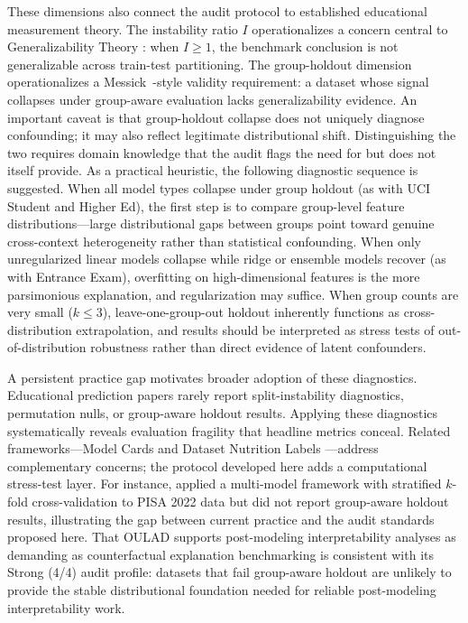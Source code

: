 \documentclass[10pt,letterpaper]{wlscirep}
\begin{document}
These dimensions also connect the audit protocol to established educational measurement theory. The instability ratio $I$ operationalizes a concern central to Generalizability Theory \citep{Brennan2001}: when $I \geq 1$, the benchmark conclusion is not generalizable across train-test partitioning. The group-holdout dimension operationalizes a Messick~\citep{Messick1995}-style validity requirement: a dataset whose signal collapses under group-aware evaluation lacks generalizability evidence. An important caveat is that group-holdout collapse does not uniquely diagnose confounding; it may also reflect legitimate distributional shift. Distinguishing the two requires domain knowledge that the audit flags the need for but does not itself provide. As a practical heuristic, the following diagnostic sequence is suggested. When all model types collapse under group holdout (as with UCI Student and Higher Ed), the first step is to compare group-level feature distributions---large distributional gaps between groups point toward genuine cross-context heterogeneity rather than statistical confounding. When only unregularized linear models collapse while ridge or ensemble models recover (as with Entrance Exam), overfitting on high-dimensional features is the more parsimonious explanation, and regularization may suffice. When group counts are very small ($k \leq 3$), leave-one-group-out holdout inherently functions as cross-distribution extrapolation, and results should be interpreted as stress tests of out-of-distribution robustness rather than direct evidence of latent confounders.

A persistent practice gap motivates broader adoption of these diagnostics. Educational prediction papers rarely report split-instability diagnostics, permutation nulls, or group-aware holdout results. Applying these diagnostics systematically reveals evaluation fragility that headline metrics conceal. Related frameworks---Model Cards \citep{Mitchell2019} and Dataset Nutrition Labels \citep{Holland2020}---address complementary concerns; the protocol developed here adds a computational stress-test layer. For instance, \citet{Sasmaz2026} applied a multi-model framework with stratified $k$-fold cross-validation to PISA 2022 data but did not report group-aware holdout results, illustrating the gap between current practice and the audit standards proposed here. That OULAD supports post-modeling interpretability analyses as demanding as counterfactual explanation benchmarking \citep{Cavus2024ce,Cavus2024benchmark} is consistent with its Strong (4/4) audit profile: datasets that fail group-aware holdout are unlikely to provide the stable distributional foundation needed for reliable post-modeling interpretability work.
\end{document}
